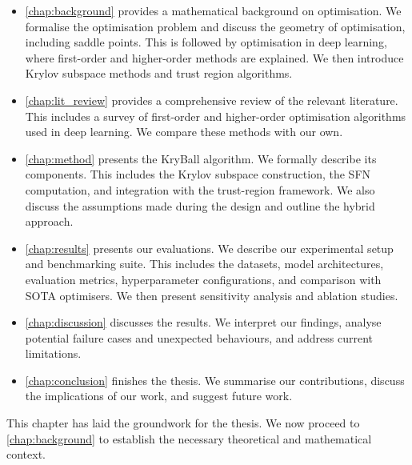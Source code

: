 \begin{itemize}
    \item \cref{chap:background} provides a mathematical background on optimisation. We formalise the optimisation problem and discuss the geometry of optimisation, including saddle points. This is followed by optimisation in deep learning, where first-order and higher-order methods are explained. We then introduce Krylov subspace methods and trust region algorithms.
    \item \cref{chap:lit_review} provides a comprehensive review of the relevant literature. This includes a survey of first-order and higher-order optimisation algorithms used in deep learning. We compare these methods with our own.
    \item \cref{chap:method} presents the KryBall algorithm. We formally describe its components. This includes the Krylov subspace construction, the SFN computation, and integration with the trust-region framework. We also discuss the assumptions made during the design and outline the hybrid approach.
    \item \cref{chap:results} presents our evaluations. We describe our experimental setup and benchmarking suite. This includes the datasets, model architectures, evaluation metrics, hyperparameter configurations, and comparison with SOTA optimisers. We then present sensitivity analysis and ablation studies.
    \item \cref{chap:discussion} discusses the results. We interpret our findings, analyse potential failure cases and unexpected behaviours, and address current limitations. 
    \item \cref{chap:conclusion} finishes the thesis. We summarise our contributions, discuss the implications of our work, and suggest future work.
\end{itemize}

This chapter has laid the groundwork for the thesis. We now proceed to \cref{chap:background} to establish the necessary theoretical and mathematical context.
